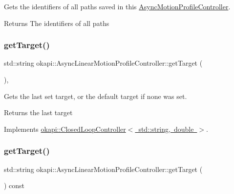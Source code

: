 Gets the identifiers of all paths saved in this \mbox{\hyperlink{classokapi_1_1AsyncMotionProfileController}{Async\+Motion\+Profile\+Controller}}.

\begin{DoxyReturn}{Returns}
The identifiers of all paths 
\end{DoxyReturn}
\mbox{\label{classokapi_1_1AsyncLinearMotionProfileController_afc9a1b30a5fd499c38455e8b05982be9}} 
\subsubsection{\texorpdfstring{getTarget()}{getTarget()}\hspace{0.1cm}{\footnotesize\ttfamily [1/2]}}
{\footnotesize\ttfamily std\+::string okapi\+::\+Async\+Linear\+Motion\+Profile\+Controller\+::get\+Target (\begin{DoxyParamCaption}{ }\end{DoxyParamCaption})\hspace{0.3cm}{\ttfamily [override]}, {\ttfamily [virtual]}}

Gets the last set target, or the default target if none was set.

\begin{DoxyReturn}{Returns}
the last target 
\end{DoxyReturn}


Implements \mbox{\hyperlink{classokapi_1_1ClosedLoopController_a22012bedbfaff6e5a3a508f274ec2497}{okapi\+::\+Closed\+Loop\+Controller$<$ std\+::string, double $>$}}.

\mbox{\label{classokapi_1_1AsyncLinearMotionProfileController_accae83d74f347e9a839eeae9d2693917}} 
\subsubsection{\texorpdfstring{getTarget()}{getTarget()}\hspace{0.1cm}{\footnotesize\ttfamily [2/2]}}
{\footnotesize\ttfamily std\+::string okapi\+::\+Async\+Linear\+Motion\+Profile\+Controller\+::get\+Target (\begin{DoxyParamCaption}{ }\end{DoxyParamCaption}) const\hspace{0.3cm}{\ttfamily [virtual]}}

